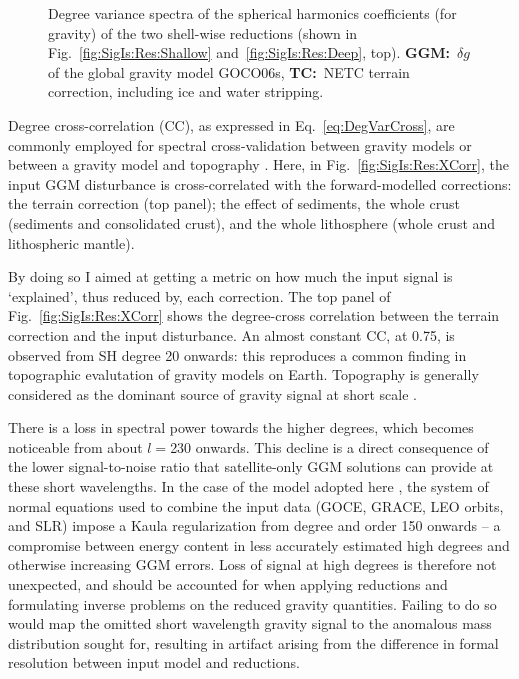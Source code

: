 \begin{figure}
    \begin{adjustbox}{center}
    \end{adjustbox}
    \caption[Degree variance spectra of the SH coefficients for the two shell-wise reductions.]{
        Degree variance spectra of the spherical harmonics coefficients (for gravity) of the two shell-wise reductions (shown in Fig.~\ref{fig:SigIs:Res:Shallow} and~\ref{fig:SigIs:Res:Deep}, top).
        \textbf{{GGM}:}~$\delta g$ of the global gravity model {GOCO06s},
        \textbf{{TC}:}~NETC terrain correction, including ice and water stripping.
        }
    \label{fig:SigIs:Spec:DegVarSD}
\end{figure}

\FloatBarrier

Degree cross-correlation (CC), as expressed in Eq.~\ref{eq:DegVarCross}, are commonly employed for spectral cross-validation between gravity models \parencite[e.g.][]{Rexer2016} or between a gravity model and topography \parencites{Wieczorek2007}{Hirt2012TopoIso}.
Here, in Fig.~\ref{fig:SigIs:Res:XCorr}, the input GGM disturbance is cross-correlated with the forward-modelled corrections: the terrain correction (top panel); the effect of sediments, the whole crust (sediments and consolidated crust), and the whole lithosphere (whole crust and lithospheric mantle).

By doing so I aimed at getting a metric on how much the input signal is `explained', thus reduced by, each correction.
The top panel of Fig.~\ref{fig:SigIs:Res:XCorr} shows the degree-cross correlation between the terrain correction and the input disturbance.
An almost constant CC, at \num[retain-explicit-plus]{+0.75}, is observed from SH degree 20 onwards: this reproduces a common finding in topographic evalutation \parencites{Hirt2012TopoIso}{Hirt2010} of gravity models on Earth.
Topography is generally considered as the dominant source of gravity signal at short scale \parencite{Forsberg1981}.

There is a loss in spectral power towards the higher degrees, which becomes noticeable from about $l=$\num{230} onwards.
This decline is a direct consequence of the lower signal-to-noise ratio that satellite-only GGM solutions can provide at these short wavelengths.
In the case of the model adopted here \parencite[GOCO06s][]{Kvas_GOCO06s_dataset}, the system of normal equations used to combine the input data (GOCE, GRACE, LEO orbits, and SLR) impose a Kaula regularization \parencite{Pail2010_GOCO01S} from degree and order \num{150} onwards -- a compromise between energy content in less accurately estimated high degrees and otherwise increasing GGM errors.
Loss of signal at high degrees is therefore not unexpected, and should be accounted for when applying reductions and formulating inverse problems on the reduced gravity quantities.
Failing to do so would map the omitted short wavelength gravity signal to the anomalous mass distribution sought for, resulting in artifact arising from the difference in formal resolution between input model and reductions.

